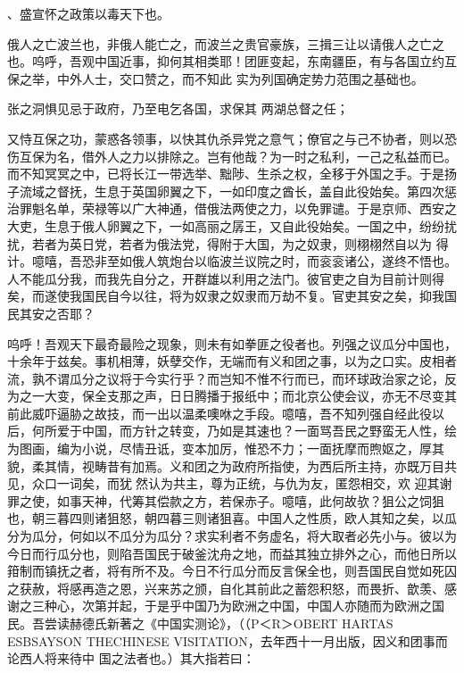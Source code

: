 \documentclass{article}
\begin{document}
\newpage
、盛宣怀之政策以毒天下也。 

俄人之亡波兰也，非俄人能亡之，而波兰之贵官豪族，三揖三让以请俄人之亡之也。呜呼，吾观中国近事，抑何其相类耶！团匪变起，东南疆臣，有与各国立约互保之举，中外人士，交口赞之，而不知此
实为列国确定势力范围之基础也。 

张之洞惧见忌于政府，乃至电乞各国，求保其
两湖总督之任； 

又恃互保之功，蒙惑各领事，以快其仇杀异党之意气；僚官之与己不协者，则以恐伤互保为名，借外人之力以排除之。岂有他哉？为一时之私利，一己之私益而已。而不知冥冥之中，已将长江一带选举、黜陟、生杀之权，全移于外国之手。于是扬子流域之督抚，生息于英国卵翼之下，一如印度之酋长，盖自此役始矣。第四次惩治罪魁名单，荣禄等以广大神通，借俄法两使之力，以免罪谴。于是京师、西安之大吏，生息于俄人卵翼之下，一如高丽之孱王，又自此役始矣。一国之中，纷纷扰扰，若者为英日党，若者为俄法党，得附于大国，为之奴隶，则栩栩然自以为
\newpage
得计。噫嘻，吾恐非至如俄人筑炮台以临波兰议院之时，而衮衮诸公，遂终不悟也。人不能瓜分我，而我先自分之，开群雄以利用之法门。彼官吏之自为目前计则得矣，而遂使我国民自今以往，将为奴隶之奴隶而万劫不复。官吏其安之矣，抑我国民其安之否耶？
 

呜呼！吾观天下最奇最险之现象，则未有如拳匪之役者也。列强之议瓜分中国也，十余年于兹矣。事机相薄，妖孽交作，无端而有义和团之事，以为之口实。皮相者流，孰不谓瓜分之议将于今实行乎？而岂知不惟不行而已，而环球政治家之论，反为之一大变，保全支那之声，日日腾播于报纸中；而北京公使会议，亦无不尽变其前此威吓逼胁之故技，而一出以温柔噢咻之手段。噫嘻，吾不知列强自经此役以后，何所爱于中国，而方针之转变，乃如是其速也？一面骂吾民之野蛮无人性，绘为图画，编为小说，尽情丑诋，变本加厉，惟恐不力；一面抚摩而煦妪之，厚其貌，柔其情，视畴昔有加焉。义和团之为政府所指使，为西后所主持，亦既万目共见，众口一词矣，而犹然认为共主，尊为正统，与仇为友，匿怨相交，欢
\newpage
迎其谢罪之使，如事天神，代筹其偿款之方，若保赤子。噫嘻，此何故欤？狙公之饲狙也，朝三暮四则诸狙怒，朝四暮三则诸狙喜。中国人之性质，欧人其知之矣，以瓜分为瓜分，何如以不瓜分为瓜分？求实利者不务虚名，将大取者必先小与。彼以为今日而行瓜分也，则陷吾国民于破釜沈舟之地，而益其独立排外之心，而他日所以箝制而镇抚之者，将有所不及。今日不行瓜分而反言保全也，则吾国民自觉如死囚之获赦，将感再造之恩，兴来苏之颁，自化其前此之蓄怨积怒，而畏折、歆羡、感谢之三种心，次第并起，于是乎中国乃为欧洲之中国，中国人亦随而为欧洲之国民。吾尝读赫德氏新著之《中国实测论》，（（P＜R＞OBERT HARTAS ESBSAYSON THECHINESE VISITATION，去年西十一月出版，因义和团事而论西人将来待中
国之法者也。）其大指若曰： 
\end{document}

